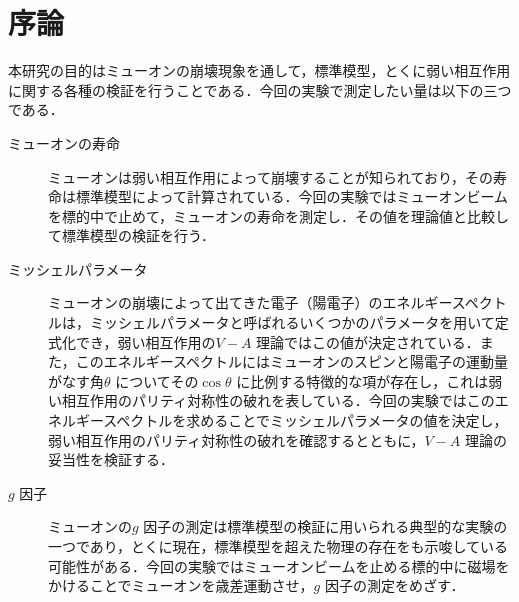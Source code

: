 





%

\section{序論}
本研究の目的はミューオンの崩壊現象を通して，標準模型，とくに弱い相互作用に関する各種の検証を行うことである．今回の実験で測定したい量は以下の三つである．

\begin{description}
\item[ミューオンの寿命]

ミューオンは弱い相互作用によって崩壊することが知られており，その寿命は標準模型によって計算されている．今回の実験ではミューオンビームを標的中で止めて，ミューオンの寿命を測定し．その値を理論値と比較して標準模型の検証を行う．
\item[ミッシェルパラメータ]

ミューオンの崩壊によって出てきた電子（陽電子）のエネルギースペクトルは，ミッシェルパラメータと呼ばれるいくつかのパラメータを用いて定式化でき，弱い相互作用の$V - A$ 理論ではこの値が決定されている．また，このエネルギースペクトルにはミューオンのスピンと陽電子の運動量がなす角$\theta$ についてその$\cos \theta$ に比例する特徴的な項が存在し，これは弱い相互作用のパリティ対称性の破れを表している．今回の実験ではこのエネルギースペクトルを求めることでミッシェルパラメータの値を決定し，弱い相互作用のパリティ対称性の破れを確認するとともに，$V - A$ 理論の妥当性を検証する．
\item[$g$ 因子]

ミューオンの$g$ 因子の測定は標準模型の検証に用いられる典型的な実験の一つであり，とくに現在，標準模型を超えた物理の存在をも示唆している可能性がある．今回の実験ではミューオンビームを止める標的中に磁場をかけることでミューオンを歳差運動させ，$g$ 因子の測定をめざす．
\end{description}

